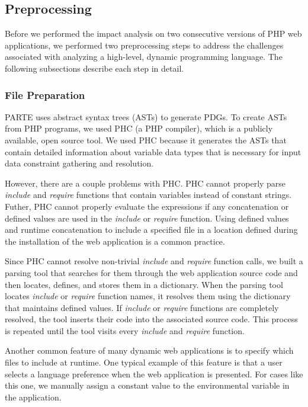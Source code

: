 
\subsection{Preprocessing}
\label{sec:preprocess}

Before we performed the impact analysis on two consecutive 
versions of PHP web applications, we performed 
two preprocessing steps to address the challenges associated 
with analyzing a high-level, dynamic programming language. 
The following subsections describe each step in detail.

\subsubsection{File Preparation}
\label{sec:fileprep}

PARTE uses abstract syntax trees (ASTs) to generate PDGs.
To create ASTs from PHP programs, we used PHC (a PHP compiler),
which is a publicly available, open source tool.
We used PHC because it generates the ASTs that contain detailed 
information about variable data types that is necessary for input 
data constraint gathering and resolution. 

However, there are a couple problems with PHC. 
PHC cannot properly parse \textit{include} and \textit{require} 
functions that contain variables instead of constant strings. 
Futher, PHC cannot properly evaluate the expressions if any 
concatenation or defined values are used in the \textit{include} 
or \textit{require} function.
Using defined values and runtime concatenation 
to include a specified file in a location defined during the 
installation of the web application is a common practice.

Since PHC cannot resolve non-trivial \textit{include} and 
\textit{require} function calls, we built a parsing tool that searches 
for them through the web application source code and then locates, 
defines, and stores them in a dictionary. When the parsing tool locates 
\textit{include} or \textit{require} function names, it resolves 
them using the dictionary that maintains defined values. 
If \textit{include} or \textit{require} functions are completely 
resolved, the tool inserts their code into the associated 
source code. This process is repeated until the tool 
visits every \textit{include} and \textit{require} function.

Another common feature of many dynamic web applications is to specify 
which files to include at runtime. One typical example of this feature 
is that a user selects a language preference when the web application 
is presented. For cases like this one, we manually assign a 
constant value to the environmental variable in the application. 

